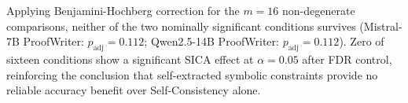 
Applying Benjamini-Hochberg correction for the $m{=}16$ non-degenerate comparisons,
neither of the two nominally significant conditions survives
(Mistral-7B ProofWriter: $p_{\text{adj}}{=}0.112$;
 Qwen2.5-14B ProofWriter: $p_{\text{adj}}{=}0.112$).
Zero of sixteen conditions show a significant SICA effect at $\alpha{=}0.05$ after FDR control,
reinforcing the conclusion that self-extracted symbolic constraints
provide no reliable accuracy benefit over Self-Consistency alone.
